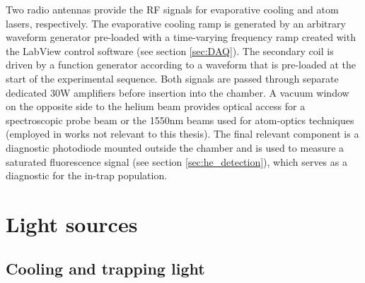 	Two radio antennas provide the RF signals for evaporative cooling and atom lasers, respectively.
	The evaporative cooling ramp is generated by an arbitrary waveform generator pre-loaded with a time-varying frequency ramp created with the LabView control software (see section \ref{sec:DAQ}).
	The secondary coil is driven by a function generator according to a waveform that is pre-loaded at the start of the experimental sequence.
	Both signals are passed through separate dedicated 30W amplifiers before insertion into the chamber.
	A vacuum window on the opposite side to the helium beam provides optical access for a spectroscopic probe beam or the 1550nm beams used for atom-optics techniques (employed in works not relevant to this thesis).
	The final relevant component is a diagnostic photodiode mounted outside the chamber and is used to measure a saturated fluorescence signal (see section \ref{sec:he_detection}), which serves as a diagnostic for the in-trap population.


\section{Light sources}\label{ssec:lasers}
\subsection*{Cooling and trapping light}
	
